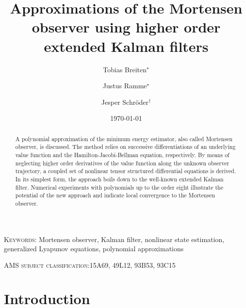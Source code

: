 \documentclass[11pt,reqno]{amsart}
\title[Higher order extended Kalman filters]{Approximations of the Mortensen observer using higher order extended Kalman filters}
\author{Tobias Breiten${}^{\star}$ \and Justus Ramme${}^\star$ \and Jesper Schr\"oder${}^\dagger$}
\date{\today}
\numberwithin{equation}{section}
\theoremstyle{plain}
\begin{document}
%
\begin{abstract}
  A polynomial approximation of the minimum energy estimator, also called Mortensen observer, is discussed. The method relies on successive differentiations of an underlying value function and the Hamilton-Jacobi-Bellman equation, respectively. By means of neglecting higher order derivatives of the value function along the unknown observer trajectory, a coupled set of nonlinear tensor structured differential equations is derived. In its simplest form, the approach boils down to the well-known extended Kalman filter. Numerical experiments with polynomials up to the order eight illustrate the potential of the new approach and indicate local convergence to the Mortensen observer.
\end{abstract}
%

\maketitle
{\footnotesize \textsc{Keywords:} Mortensen observer, Kalman filter, nonlinear state estimation, generalized Lyapunov equations, polynomial approximations}

{\footnotesize \textsc{AMS subject classification:15A69, 49L12, 93B53, 93C15}} 


% 
\section{Introduction}
%
\end{document}
